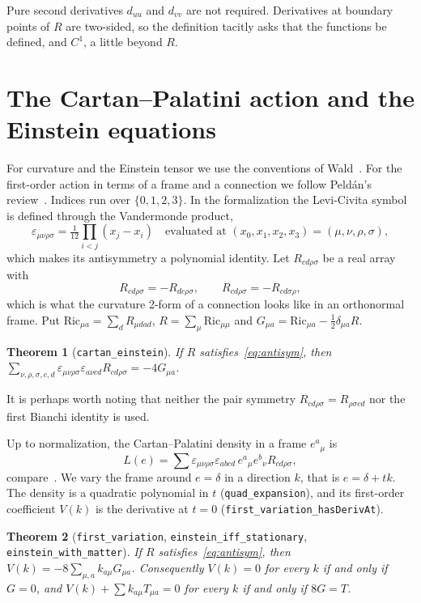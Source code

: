 \documentclass[pdflatex,sn-mathphys-num]{sn-jnl}%
\theoremstyle{thmstyleone}%
\newtheorem{theorem}{Theorem}%
\theoremstyle{thmstyletwo}%
\theoremstyle{thmstylethree}%
\newcommand{\lean}[1]{\texttt{#1}}
\begin{document}
Pure second derivatives $d_{uu}$ and $d_{vv}$ are not required. Derivatives at boundary points of $R$ are two-sided, so the definition tacitly asks that the functions be defined, and $C^1$, a little beyond $R$.

\section{The Cartan--Palatini action and the Einstein equations}\label{sec:action}

For curvature and the Einstein tensor we use the conventions of Wald~\cite{Wald1984}. For the first-order action in terms of a frame and a connection we follow Peld\'an's review~\cite{Peldan1994}. Indices run over $\{0,1,2,3\}$. In the formalization the Levi-Civita symbol is defined through the Vandermonde product,
\[
\varepsilon_{\mu\nu\rho\sigma}=\tfrac{1}{12}\prod_{i<j}(x_j-x_i)\quad\text{evaluated at }(x_0,x_1,x_2,x_3)=(\mu,\nu,\rho,\sigma),
\]
which makes its antisymmetry a polynomial identity. Let $R_{cd\rho\sigma}$ be a real array with
\begin{equation}\label{eq:antisym}
R_{cd\rho\sigma}=-R_{dc\rho\sigma},\qquad R_{cd\rho\sigma}=-R_{cd\sigma\rho},
\end{equation}
which is what the curvature 2-form of a connection looks like in an orthonormal frame. Put $\mathrm{Ric}_{\mu a}=\sum_d R_{\mu dad}$, $R=\sum_\mu\mathrm{Ric}_{\mu\mu}$ and $G_{\mu a}=\mathrm{Ric}_{\mu a}-\tfrac12\delta_{\mu a}R$.

\begin{theorem}[\lean{cartan\_einstein}]\label{thm:epseps}
If $R$ satisfies~\eqref{eq:antisym}, then $\sum_{\nu,\rho,\sigma,c,d}\varepsilon_{\mu\nu\rho\sigma}\varepsilon_{a\nu cd}R_{cd\rho\sigma}=-4G_{\mu a}$.
\end{theorem}

It is perhaps worth noting that neither the pair symmetry $R_{cd\rho\sigma}=R_{\rho\sigma cd}$ nor the first Bianchi identity is used.

Up to normalization, the Cartan--Palatini density in a frame $e^a{}_\mu$ is
\[
L(e)=\sum\varepsilon_{\mu\nu\rho\sigma}\varepsilon_{abcd}\,e^a{}_\mu e^b{}_\nu R_{cd\rho\sigma},
\]
compare~\cite{Peldan1994}. We vary the frame around $e=\delta$ in a direction $k$, that is $e=\delta+tk$. The density is a quadratic polynomial in $t$ (\lean{quad\_expansion}), and its first-order coefficient $V(k)$ is the derivative at $t=0$ (\lean{first\_variation\_hasDerivAt}).

\begin{theorem}[\lean{first\_variation}, \lean{einstein\_iff\_stationary}, \lean{einstein\_with\_matter}]\label{thm:variation}
If $R$ satisfies~\eqref{eq:antisym}, then $V(k)=-8\sum_{\mu,a}k_{a\mu}G_{\mu a}$. Consequently $V(k)=0$ for every $k$ if and only if $G=0$, and $V(k)+\sum k_{a\mu}T_{\mu a}=0$ for every $k$ if and only if $8G=T$.
\end{theorem}
\end{document}
